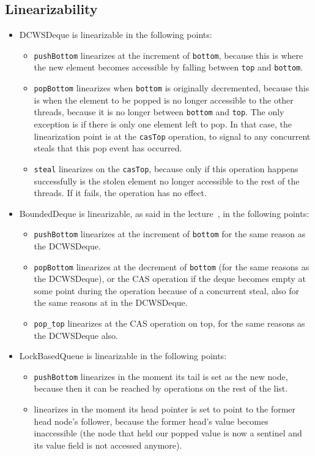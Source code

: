 \documentclass [10pt]{scrartcl}
\begin{document}
   \subsection{Linearizability}
   \begin{itemize}
      \item DCWSDeque is linearizable in the following points:
      \begin{itemize}
         \item \texttt{pushBottom} linearizes at the increment of \texttt{bottom}, because this is where the new element becomes accessible by falling between \texttt{top} and \texttt{bottom}.
         \item \texttt{popBottom} linearizes when \texttt{bottom} is originally decremented, because this is when the element to be popped is no longer accessible to the other threads, because it is no longer between \texttt{bottom} and \texttt{top}. The only exception is if there is only one element left to pop. In that case, the linearization point is at the \texttt{casTop} operation, to signal to any concurrent steals that this pop event has occurred.
         \item \texttt{steal} linearizes on the \texttt{casTop}, because only if this operation happens successfully is the stolen element no longer accessible to the rest of the threads. If it fails, the operation has no effect.
      \end{itemize}
      \item BoundedDeque is linearizable, as said in the lecture~\cite{PP}, in the following points:
      \begin{itemize}
         \item \texttt{pushBottom} linearizes at the increment of \texttt{bottom} for the same reason as the DCWSDeque.
         \item \texttt{popBottom} linearizes at the decrement of \texttt{bottom} (for the same reasons as the DCWSDeque), or the CAS operation if the deque becomes empty at some point during the operation because of a concurrent steal, also for the same reasons at in the DCWSDeque.
         \item \texttt{pop\_top} linearizes at the CAS operation on top, for the same reasons as the DCWSDeque also.
      \end{itemize}
      \item LockBasedQueue is linearizable in the following points:
      \begin{itemize}
         \item \texttt{pushBottom} linearizes in the moment its tail is set as the new node, because then it can be reached by operations on the rest of the list.
         \item {} linearizes in the moment its head pointer is set to point to the former head node's follower, because the former head's value becomes inaccessible (the node that held our popped value is now a sentinel and its value field is not accessed anymore).
      \end{itemize}
   \end{itemize}
   
\end{document}

